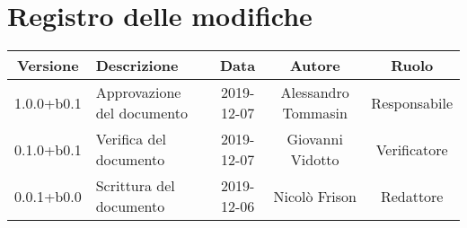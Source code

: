 \section*{Registro delle modifiche}

\begin{center}
	\begin{longtable}{|c|p{3cm}|c|c|c|}
	\hline
	\rowcolor{lighter-grayer}
	\textbf{Versione} & \textbf{Descrizione} & \textbf{Data} & \textbf{Autore} & \textbf{Ruolo} \\
	\hline
	\endfirsthead


	1.0.0+b0.1 & Approvazione del documento & 2019-12-07 & Alessandro Tommasin & Responsabile \\
	\hline
	0.1.0+b0.1 & Verifica del documento & 2019-12-07 & Giovanni Vidotto & Verificatore \\
	\hline
	0.0.1+b0.0 & Scrittura del documento & 2019-12-06 & Nicolò Frison & Redattore \\

	\hline

	\end{longtable}
\end{center}
